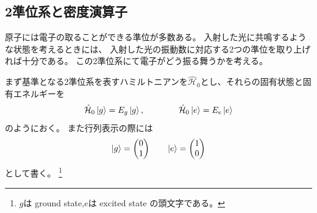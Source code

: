 \documentclass[11pt,dvipdfmx,a4paper]{jsarticle}
\begin{document}
\subsection{2準位系と密度演算子}
原子には電子の取ることができる準位が多数ある。
入射した光に共鳴するような状態を考えるときには、
入射した光の振動数に対応する2つの準位を取り上げれば十分である。
この2準位系にて電子がどう振る舞うかを考える。

まず基準となる2準位系を表すハミルトニアンを\(\hat{\mathcal{H}}_0\)とし、それらの固有状態と固有エネルギーを
\begin{equation}
	\hat{\mathcal{H}}_0 \ket{g} = E_g \ket{g}, \qquad \qquad \hat{\mathcal{H}}_0 \ket{e} = E_e \ket{e}
\end{equation}
のようにおく。
また行列表示の際には
\begin{equation}
	\ket{g} =
	\begin{pmatrix}
		0\\
		1
	\end{pmatrix}
	\qquad
	\ket{e} =
	\begin{pmatrix}
		1 \\
		0
	\end{pmatrix}
\end{equation}
として書く。
\footnote{\(g\)は ground state,\(e\)は excited state の頭文字である。}
\end{document}
